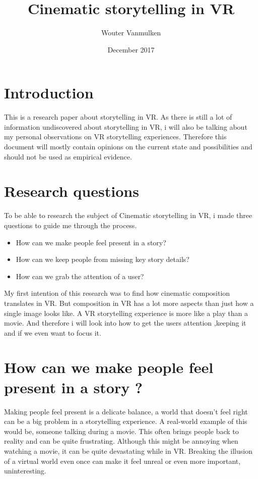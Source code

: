 \documentclass{report}
\title{Cinematic storytelling in VR}
\author{Wouter Vanmulken}
\date{December 2017}
\begin{document}
				\maketitle
				\tableofcontents
				\newpage
		
				\chapter{Introduction}
				
				This is a research paper about storytelling in VR. As there is still a lot of information undiscovered about storytelling in VR, i will also be talking about my personal observations on VR storytelling experiences. Therefore this document will mostly contain opinions on the current state and possibilities and should not be used as empirical evidence.
				
				\chapter{Research questions}
		
				To be able to research the subject of Cinematic storytelling in VR, i made three questions to guide me through the process.
				\begin{itemize}
					\item How can we make people feel present in a story?
					\item How can we keep people from missing key story details?
					\item How can we grab the attention of a user?
				\end{itemize}

				My first intention of this research was to find how cinematic composition translates in VR. But composition in VR has a lot more aspects than just how a single image looks like. A VR storytelling experience is more like a play than a movie. And therefore i will look into how to get the users attention ,keeping it and if we even want to focus it.
				

				
				\chapter{How can we make people feel present in a story ?}
								
				Making people feel present is a delicate balance, a world that doesn't feel right can be a big problem in a storytelling experience. A real-world example of this would be, someone talking during a movie. This often brings people back to reality and can be quite frustrating. Although this might be annoying when watching a movie, it can be quite devastating while in VR. Breaking the illusion of a virtual world even once can make it feel unreal or even more important, uninteresting.
\end{document}
